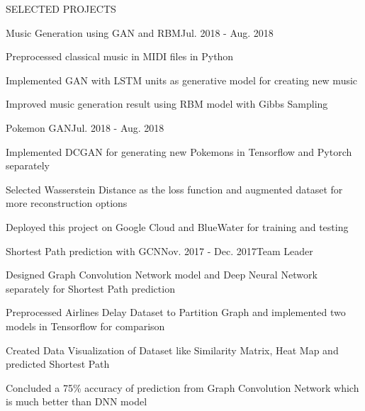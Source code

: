 \documentclass{resume} %
\begin{document}
\begin{rSection}{SELECTED PROJECTS}

\begin{rSubsection}{Music Generation using GAN and RBM}{Jul. 2018 - Aug. 2018}{}{}
\item Preprocessed classical music in MIDI files in Python
\item Implemented GAN with LSTM units as generative model for creating new music
\item Improved music generation result using RBM model with Gibbs Sampling
\end{rSubsection}



\begin{rSubsection}{Pokemon GAN}{Jul. 2018 - Aug. 2018}{}{}
\item Implemented DCGAN for generating new Pokemons in Tensorflow and Pytorch separately
\item Selected Wasserstein Distance as the loss function and augmented dataset for more reconstruction options
\item Deployed this project on Google Cloud and BlueWater for training and testing
\end{rSubsection}



\begin{rSubsection}{Shortest Path prediction with GCN}{Nov. 2017 - Dec. 2017}{Team Leader}{}
\item Designed Graph Convolution Network model and Deep Neural Network separately for Shortest Path prediction
\item Preprocessed Airlines Delay Dataset to Partition Graph and implemented two models in Tensorflow for comparison
\item Created Data Visualization of Dataset like Similarity Matrix, Heat Map and predicted Shortest Path
\item Concluded a 75\% accuracy of prediction from Graph Convolution Network which is much better than DNN model
\end{rSubsection}




\end{rSection}
\end{document}
